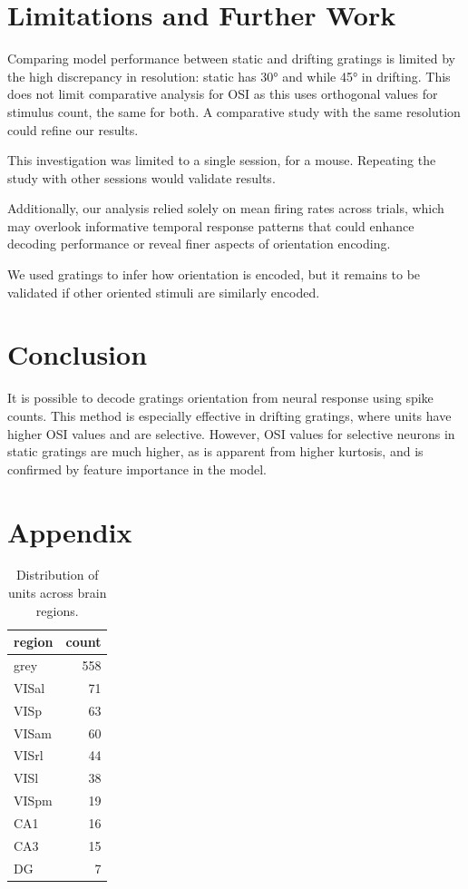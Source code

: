 \documentclass[10pt,twocolumn]{article}
\begin{document}
\section{Limitations and Further Work}

Comparing model performance between static and drifting gratings is limited by the high discrepancy in resolution: static has 30° and while 45° in drifting. This does not limit comparative analysis for OSI as this uses orthogonal values for stimulus count, the same for both. A comparative study with the same resolution could refine our results.

This investigation was limited to a single session, for a mouse. Repeating the study with other sessions would validate results.

Additionally, our analysis relied solely on mean firing rates across trials, which may overlook informative temporal response patterns that could enhance decoding performance or reveal finer aspects of orientation encoding.

We used gratings to infer how orientation is encoded, but it remains to be validated if other oriented stimuli are similarly encoded.

\section{Conclusion}

It is possible to decode gratings orientation from neural response using spike counts. This method is especially effective in drifting gratings, where units have higher OSI values and are selective. However, OSI values for selective neurons in static gratings are much higher, as is apparent from higher kurtosis, and is confirmed by feature importance in the model.

\newpage

\appendix

\section{Appendix}

\begin{table}[H]
\centering
\begin{tabular}{lr}
\toprule
region & count \\
\midrule
grey   & 558 \\
VISal  &  71 \\
VISp   &  63 \\
VISam  &  60 \\
VISrl  &  44 \\
VISl   &  38 \\
VISpm  &  19 \\
CA1    &  16 \\
CA3    &  15 \\
DG     &   7 \\
\bottomrule
\end{tabular}
\caption{Distribution of units across brain regions.}
\label{tab:regions}
\end{table}
\end{document}
